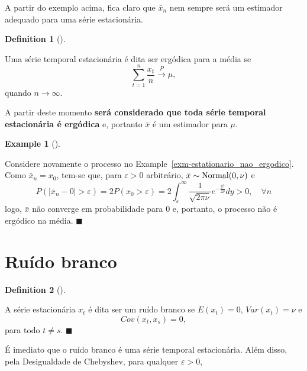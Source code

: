 \documentclass[
  letterpaper,
  DIV=11,
  numbers=noendperiod]{scrartcl}
\theoremstyle{definition}
\newtheorem{example}{Example}[chapter]
\theoremstyle{definition}
\newtheorem{definition}{Definition}[chapter]
\theoremstyle{plain}
\theoremstyle{plain}
\theoremstyle{remark}
\begin{document}
A partir do exemplo acima, fica claro que \(\bar{x}_n\) nem sempre será
um estimador adequado para uma série estacionária.

\begin{definition}[]\protect\hypertarget{def-ergodica}{}\label{def-ergodica}

Uma série temporal estacionária é dita ser ergódica para a média se
\[\sum_{t=1}^n\frac{x_t}{n}\stackrel{P}{\rightarrow} \mu,\] quando
\(n\rightarrow\infty\).

\end{definition}

A partir deste momento \textbf{será considerado que toda série temporal
estacionária é ergódica} e, portanto \(\bar{x}\) é um estimador para
\(\mu\).

\begin{example}[]\protect\hypertarget{exm-estationario_nao_ergodico_conclusao}{}\label{exm-estationario_nao_ergodico_conclusao}

Considere novamente o processo no
Example~\ref{exm-estationario_nao_ergodico}. Como \(\bar{x}_n=x_0\),
tem-se que, para \(\varepsilon>0\) arbitrário,
\(\bar{x}\sim\hbox{Normal}(0,\nu)\) e
\[P(|\bar{x}_n-0|>\varepsilon)=2P(x_0>\varepsilon)=2\int_\varepsilon^{\infty} \frac{1}{\sqrt{2\pi\nu}}e^{-\frac{y^2}{2\nu}}dy>0,\quad \forall n\]
logo, \(\bar{x}\) não converge em probabilidade para \(0\) e, portanto,
o processo não é ergódico na média. \(\blacksquare\)

\end{example}

\section{Ruído branco}\label{ruuxeddo-branco}

\begin{definition}[]\protect\hypertarget{def-ruido_branco}{}\label{def-ruido_branco}

A série estacionária \(x_t\) é dita ser um ruído branco se \(E(x_t)=0\),
\(Var(x_t)=\nu\) e \begin{equation}
        Cov(x_t,x_s)=0,
        \end{equation} para todo \(t\neq s\). \(\blacksquare\)

\end{definition}

É imediato que o ruído branco é uma série temporal estacionária. Além
disso, pela Desigualdade de Chebyshev, para qualquer \(\varepsilon>0\),
\end{document}
